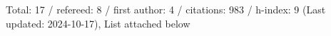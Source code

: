 Total: 17 / refereed: 8 / first author: 4 / citations: 983 / h-index: 9 (Last updated: 2024-10-17), List attached below